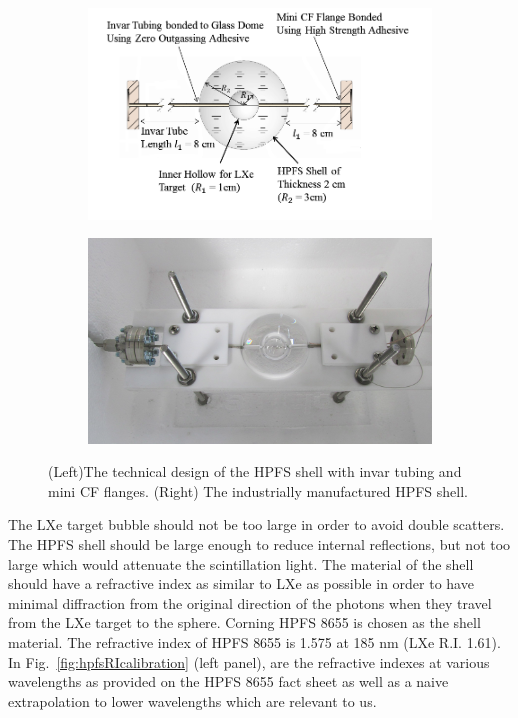\begin{figure}[h]
\centering
\begin{subfigure}[c]{0.4\textheight}
\includegraphics[width=\textwidth]{spheredesign1.png}
\end{subfigure}
\begin{subfigure}[c]{0.25\textheight}
\includegraphics[width=\textwidth]{spherephoto.png}
\end{subfigure}
\caption{(Left)The technical design of the HPFS shell with invar tubing and mini CF flanges. 
(Right) The industrially manufactured HPFS shell.} 
\label{fig:sphere}
\end{figure}



The LXe target bubble should not be too large in order to avoid double scatters. 
The HPFS shell should be large enough to reduce internal reflections, but not 
too large which would attenuate the scintillation light. The material of the 
shell should have a refractive index as similar to LXe as possible in order to 
have minimal diffraction from the original direction of the photons when they 
travel from the LXe target to the sphere. Corning HPFS 8655 is chosen as the shell 
material. The refractive index of HPFS 8655 is 1.575 at 185 nm (LXe R.I. 1.61). 
In Fig.~\ref{fig:hpfsRIcalibration} (left panel), are the refractive indexes at various wavelengths 
as provided on the HPFS 8655 fact sheet as well as a naive extrapolation to lower wavelengths 
which are relevant to us. 

